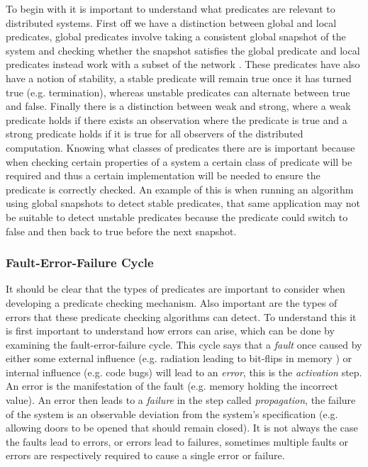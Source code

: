 To begin with it is important to understand what predicates are relevant to distributed systems. First off we have a distinction between global and local predicates, global predicates involve taking a consistent global snapshot of the system and checking whether the snapshot satisfies the global predicate \cite{277788} and local predicates instead work with a subset of the network \cite{553309}. These predicates have also have a notion of stability, a stable predicate will remain true once it has turned true (e.g. termination), whereas unstable predicates can alternate between true and false. Finally there is a distinction between weak and strong, where a weak predicate holds if there exists an observation where the predicate is true and a strong predicate holds if it is true for all observers of the distributed computation\cite{553309,Cooper:1991:CDG:127695.122774}. Knowing what classes of predicates there are is important because when checking certain properties of a system a certain class of predicate will be required and thus a certain implementation will be needed to ensure the predicate is correctly checked. An example of this is when running an algorithm using global snapshots to detect stable predicates, that same application may not be suitable to detect unstable predicates because the predicate could switch to false and then back to true before the next snapshot.

\subsubsection*{Fault-Error-Failure Cycle}

It should be clear that the types of predicates are important to consider when developing a predicate checking mechanism. Also important are the types of errors that these predicate checking algorithms can detect. To understand this it is first important to understand how errors can arise, which can be done by examining the fault-error-failure cycle. This cycle says that a \emph{fault} once caused by either some external influence (e.g. radiation leading to bit-flips in memory \cite{?}) or internal influence (e.g. code bugs) will lead to an \emph{error}, this is the \emph{activation} step. An error is the manifestation of the fault (e.g. memory holding the incorrect value). An error then leads to a \emph{failure} in the step called \emph{propagation}, the failure of the system is an observable deviation from the system's specification (e.g. allowing doors to be opened that should remain closed). It is not always the case the faults lead to errors, or errors lead to failures, sometimes multiple faults or errors are respectively required to cause a single error or failure. \cite{1335465}

